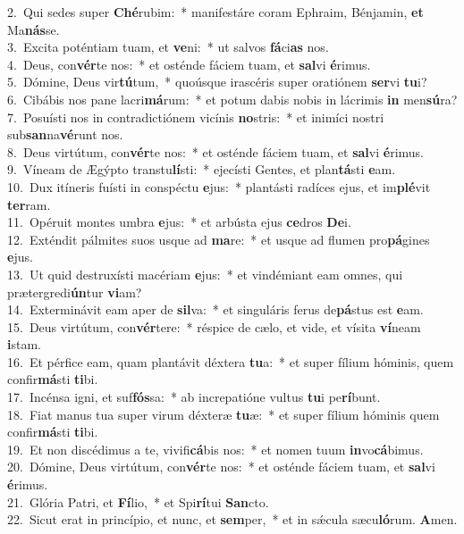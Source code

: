 {2.~}Qui sedes super \textbf{Ché}rubim:~* manifestáre coram Ephraim, Bénjamin, \textbf{et} Ma\textbf{nás}se.\\
{3.~}Excita poténtiam tuam, et \textbf{ve}ni:~* ut salvos \textbf{fá}ci\textbf{as} nos.\\
{4.~}Deus, con\textbf{vér}te nos:~* et osténde fáciem tuam, et \textbf{sal}vi \textbf{é}rimus.\\
{5.~}Dómine, Deus vir\textbf{tú}tum,~* quoúsque irascéris super oratiónem \textbf{ser}vi \textbf{tu}i?\\
{6.~}Cibábis nos pane lacri\textbf{má}rum:~* et potum dabis nobis in lácrimis \textbf{in} men\textbf{sú}ra?\\
{7.~}Posuísti nos in contradictiónem vicínis \textbf{no}stris:~* et inimíci nostri sub\textbf{san}na\textbf{vé}runt nos.\\
{8.~}Deus virtútum, con\textbf{vér}te nos:~* et osténde fáciem tuam, et \textbf{sal}vi \textbf{é}rimus.\\
{9.~}Víneam de Ægýpto transtu\textbf{lí}sti:~* ejecísti Gentes, et plan\textbf{tá}sti \textbf{e}am.\\
{10.~}Dux itíneris fuísti in conspéctu \textbf{e}jus:~* plantásti radíces ejus, et im\textbf{plé}vit \textbf{ter}ram.\\
{11.~}Opéruit montes umbra \textbf{e}jus:~* et arbústa ejus \textbf{ce}dros \textbf{De}i.\\
{12.~}Exténdit pálmites suos usque ad \textbf{ma}re:~* et usque ad flumen pro\textbf{pá}gines \textbf{e}jus.\\
{13.~}Ut quid destruxísti macériam \textbf{e}jus:~* et vindémiant eam omnes, qui prætergredi\textbf{ún}tur \textbf{vi}am?\\
{14.~}Exterminávit eam aper de \textbf{sil}va:~* et singuláris ferus de\textbf{pá}stus est \textbf{e}am.\\
{15.~}Deus virtútum, con\textbf{vér}tere:~* réspice de cælo, et vide, et vísita \textbf{ví}neam \textbf{i}stam.\\
{16.~}Et pérfice eam, quam plantávit déxtera \textbf{tu}a:~* et super fílium hóminis, quem confir\textbf{má}sti \textbf{ti}bi.\\
{17.~}Incénsa igni, et suf\textbf{fós}sa:~* ab increpatióne vultus \textbf{tu}i pe\textbf{rí}bunt.\\
{18.~}Fiat manus tua super virum déxteræ \textbf{tu}æ:~* et super fílium hóminis quem confir\textbf{má}sti \textbf{ti}bi.\\
{19.~}Et non discédimus a te, vivifi\textbf{cá}bis nos:~* et nomen tuum \textbf{in}vo\textbf{cá}bimus.\\
{20.~}Dómine, Deus virtútum, con\textbf{vér}te nos:~* et osténde fáciem tuam, et \textbf{sal}vi \textbf{é}rimus.\\
{21.~}Glória Patri, et \textbf{Fí}lio,~* et Spi\textbf{rí}tui \textbf{San}cto.\\
{22.~}Sicut erat in princípio, et nunc, et \textbf{sem}per,~* et in sǽcula sæcu\textbf{ló}rum. \textbf{A}men.\\

